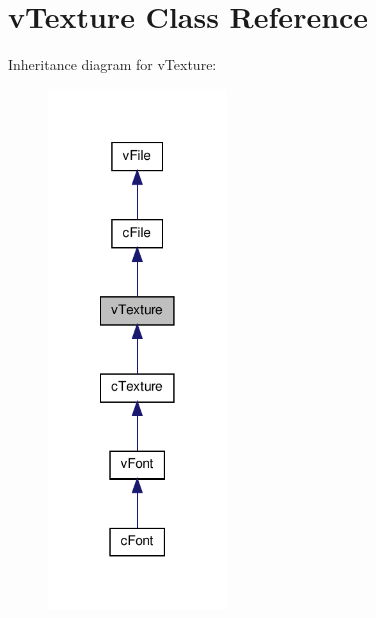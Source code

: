\hypertarget{classv_texture}{
\section{vTexture Class Reference}
\label{classv_texture}
}


Inheritance diagram for vTexture:
\nopagebreak
\begin{figure}[H]
\begin{center}
\leavevmode
\includegraphics[width=134pt]{classv_texture__inherit__graph}
\end{center}
\end{figure}


